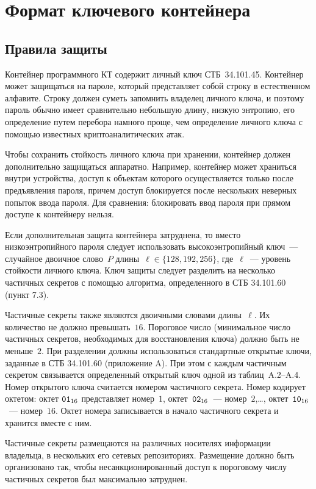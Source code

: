 \chapter{Формат ключевого контейнера}\label{CONT}

\section{Правила защиты}\label{CONT.Rules}

Контейнер программного КТ содержит личный ключ СТБ~34.101.45.
Контейнер может защищаться на пароле, который представляет собой строку в 
естественном алфавите. Строку должен суметь запомнить владелец личного ключа, и 
поэтому пароль обычно имеет сравнительно небольшую длину, низкую энтропию, его  
определение путем перебора намного проще, чем определение личного ключа с 
помощью известных криптоаналитических атак. 

Чтобы сохранить стойкость личного ключа при хранении, контейнер должен
дополнительно защищаться аппаратно. Например, контейнер может храниться
внутри устройства, доступ к объектам которого осуществляется только после 
предъявления пароля, причем доступ блокируется после нескольких неверных 
попыток ввода пароля. Для сравнения: блокировать ввод пароля при прямом 
доступе к контейнеру нельзя.  

Если дополнительная защита контейнера затруднена, то вместо 
низкоэнтропийного пароля следует использовать высокоэнтропийный ключ~--- 
случайное двоичное слово~$P$ длины~$\ell\in\{128,192,256\}$, где~$\ell$~--- 
уровень стойкости личного ключа.  
%
Ключ защиты следует разделить на несколько частичных секретов с помощью 
алгоритма, определенного в СТБ 34.101.60 (пункт 7.3). 

Частичные секреты также являются двоичными словами длины~$\ell$. Их количество не 
должно превышать~$16$. Пороговое число (минимальное число частичных секретов,
необходимых для восстановления ключа) должно быть не меньше~$2$.
%
При разделении должны использоваться стандартные открытые 
ключи, заданные в СТБ 34.101.60 (приложение A). При этом с каждым 
частичным секретом связывается определенный открытый ключ одной из 
таблиц~A.2--A.4.  
%
Номер открытого ключа считается номером частичного секрета.
Номер кодирует октетом: октет $\texttt{01}_{16}$ представляет номер~$1$, 
октет~$\texttt{02}_{16}$~--- номер~$2$,\ldots, октет~$\texttt{10}_{16}$~--- номер~$16$.
Октет номера записывается в начало частичного секрета и хранится вместе с 
ним.

Частичные секреты размещаются на различных носителях информации 
владельца, в нескольких его сетевых репозиториях. 
%
Размещение должно быть организовано так, чтобы несанкционированный 
доступ к пороговому числу частичных секретов был максимально затруднен.

